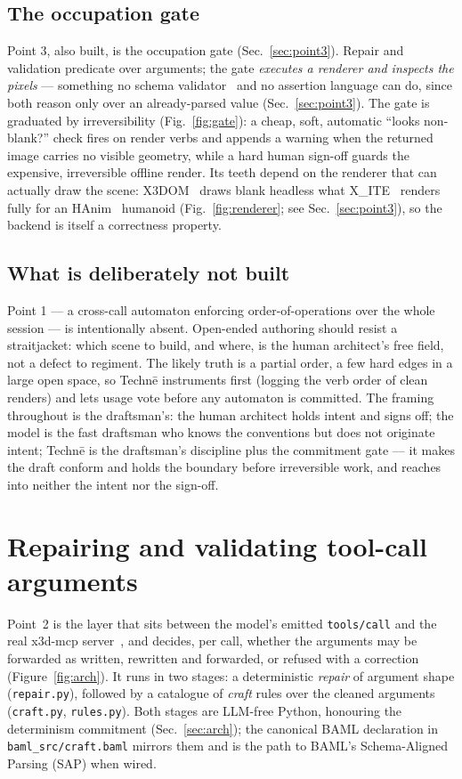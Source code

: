 \documentclass[sigconf,nonacm,screen,anonymous]{acmart}
\begin{document}
\subsection{The occupation gate}

Point 3, also built, is the occupation gate (Sec.~\ref{sec:point3}). Repair and validation predicate over arguments; the gate \emph{executes a renderer and inspects the pixels} --- something no schema validator~\cite{jsonschema} and no assertion language can do, since both reason only over an already-parsed value (Sec.~\ref{sec:point3}). The gate is graduated by irreversibility (Fig.~\ref{fig:gate}): a cheap, soft, automatic ``looks non-blank?'' check fires on render verbs and appends a warning when the returned image carries no visible geometry, while a hard human sign-off guards the expensive, irreversible offline render. Its teeth depend on the renderer that can actually draw the scene: X3DOM~\cite{x3dom} draws blank headless what X\_ITE~\cite{xite} renders fully for an HAnim~\cite{hanim} humanoid (Fig.~\ref{fig:renderer}; see Sec.~\ref{sec:point3}), so the backend is itself a correctness property.

\subsection{What is deliberately not built}

Point 1 --- a cross-call automaton enforcing order-of-operations over the whole session --- is intentionally absent. Open-ended authoring should resist a straitjacket: which scene to build, and where, is the human architect's free field, not a defect to regiment. The likely truth is a partial order, a few hard edges in a large open space, so Technē instruments first (logging the verb order of clean renders) and lets usage vote before any automaton is committed. The framing throughout is the draftsman's: the human architect holds intent and signs off; the model is the fast draftsman who knows the conventions but does not originate intent; Technē is the draftsman's discipline plus the commitment gate --- it makes the draft conform and holds the boundary before irreversible work, and reaches into neither the intent nor the sign-off.

\section{Repairing and validating tool-call arguments}\label{sec:point2}

Point~2 is the layer that sits between the model's emitted \texttt{tools/call} and the real x3d-mcp server~\cite{mcp}, and decides, per call, whether the arguments may be forwarded as written, rewritten and forwarded, or refused with a correction (Figure~\ref{fig:arch}). It runs in two stages: a deterministic \emph{repair} of argument shape (\texttt{repair.py}), followed by a catalogue of \emph{craft} rules over the cleaned arguments (\texttt{craft.py}, \texttt{rules.py}). Both stages are LLM-free Python, honouring the determinism commitment (Sec.~\ref{sec:arch}); the canonical BAML declaration in \texttt{baml\_src/craft.baml} mirrors them and is the path to BAML's Schema-Aligned Parsing (SAP) when wired.
\end{document}
